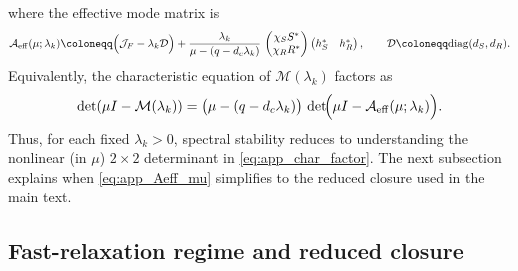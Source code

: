 \documentclass[pdflatex,sn-mathphys-ay]{sn-jnl}
\theoremstyle{thmstyleone}
\theoremstyle{definition}
\theoremstyle{remark}
\begin{document}
where the effective mode matrix is
\begin{equation}
\label{eq:app_Aeff_mu}
\mathcal{A}_{\mathrm{eff}}(\mu;\lambda_k)
\coloneqq
\Bigl(\mathcal{J}_F-\lambda_k \mathcal{D}\Bigr)
+
\frac{\lambda_k}{\mu-(q-d_c\lambda_k)}\,
\begin{pmatrix}
\chi_S S^*\\ \chi_R R^*
\end{pmatrix}
\begin{pmatrix}
h_S^* & h_R^*
\end{pmatrix},
\qquad
\mathcal{D}\coloneqq \mathrm{diag}(d_S,d_R).
\end{equation}
Equivalently, the characteristic equation of $\mathcal{M}(\lambda_k)$ factors as
\begin{equation}
\label{eq:app_char_factor}
\det(\mu I-\mathcal{M}(\lambda_k))
=
\bigl(\mu-(q-d_c\lambda_k)\bigr)\,
\det\!\Bigl(\mu I-\mathcal{A}_{\mathrm{eff}}(\mu;\lambda_k)\Bigr).
\end{equation}
Thus, for each fixed $\lambda_k>0$, spectral stability reduces to understanding the nonlinear (in $\mu$) $2\times2$ determinant
in \eqref{eq:app_char_factor}. The next subsection explains when \eqref{eq:app_Aeff_mu} simplifies to the reduced closure
used in the main text.

\subsection{Fast-relaxation regime and reduced closure}
\label{app:closure_fast_relaxation}
\end{document}
